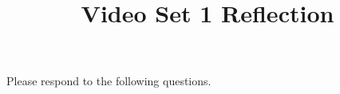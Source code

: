 \documentclass[handout]{ximera}
\title{Video Set 1 Reflection}
\begin{document}
\begin{abstract}
\end{abstract}


\maketitle

Please respond to the following questions.\\

\end{document}
